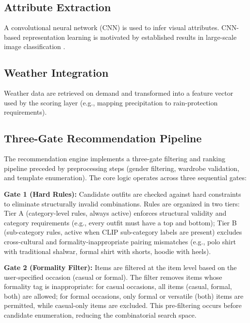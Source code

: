 \documentclass[stu,man]{apa7}
\begin{document}
\subsection{Attribute Extraction}
A convolutional neural network (CNN) is used to infer visual attributes.
CNN-based representation learning is motivated by established results in large-scale image classification \parencite{NIPS2012_c399862d}.

\subsection{Weather Integration}
Weather data are retrieved on demand and transformed into a feature vector used by the scoring layer (e.g., mapping precipitation to rain-protection requirements).

\subsection{Three-Gate Recommendation Pipeline}

The recommendation engine implements a three-gate filtering and ranking pipeline preceded by preprocessing steps (gender filtering, wardrobe validation, and template enumeration). The core logic operates across three sequential gates:

\textbf{Gate 1 (Hard Rules):} Candidate outfits are checked against hard constraints to eliminate structurally invalid combinations. Rules are organized in two tiers: Tier A (category-level rules, always active) enforces structural validity and category requirements (e.g., every outfit must have a top and bottom); Tier B (sub-category rules, active when CLIP sub-category labels are present) excludes cross-cultural and formality-inappropriate pairing mismatches (e.g., polo shirt with traditional shalwar, formal shirt with shorts, hoodie with heels).

\textbf{Gate 2 (Formality Filter):} Items are filtered at the item level based on the user-specified occasion (casual or formal). The filter removes items whose formality tag is inappropriate: for casual occasions, all items (casual, formal, both) are allowed; for formal occasions, only formal or versatile (both) items are permitted, while casual-only items are excluded. This pre-filtering occurs before candidate enumeration, reducing the combinatorial search space.
\end{document}
